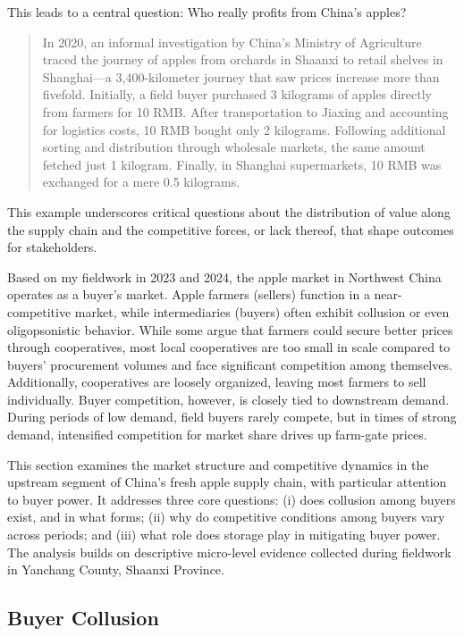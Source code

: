 This leads to a central question: Who really profits from China's apples?

\begin{quote}
    In 2020, an informal investigation by China's Ministry of Agriculture traced the journey of apples from orchards in Shaanxi to retail shelves in Shanghai—a 3,400-kilometer journey that saw prices increase more than fivefold. Initially, a field buyer purchased 3 kilograms of apples directly from farmers for 10 RMB. After transportation to Jiaxing and accounting for logistics costs, 10 RMB bought only 2 kilograms. Following additional sorting and distribution through wholesale markets, the same amount fetched just 1 kilogram. Finally, in Shanghai supermarkets, 10 RMB was exchanged for a mere 0.5 kilograms.
\end{quote}

This example underscores critical questions about the distribution of value along the supply chain and the competitive forces, or lack thereof, that shape outcomes for stakeholders.

Based on my fieldwork in 2023 and 2024, the apple market in Northwest China operates as a buyer's market. Apple farmers (sellers) function in a near-competitive market, while intermediaries (buyers) often exhibit collusion or even oligopsonistic behavior. While some argue that farmers could secure better prices through cooperatives, most local cooperatives are too small in scale compared to buyers' procurement volumes and face significant competition among themselves. Additionally, cooperatives are loosely organized, leaving most farmers to sell individually. Buyer competition, however, is closely tied to downstream demand. During periods of low demand, field buyers rarely compete, but in times of strong demand, intensified competition for market share drives up farm-gate prices.

This section examines the market structure and competitive dynamics in the upstream segment of China's fresh apple supply chain, with particular attention to buyer power. It addresses three core questions: (i) does collusion among buyers exist, and in what forms; (ii) why do competitive conditions among buyers vary across periods; and (iii) what role does storage play in mitigating buyer power. The analysis builds on descriptive micro-level evidence collected during fieldwork in Yanchang County, Shaanxi Province.

\subsection{Buyer Collusion}
